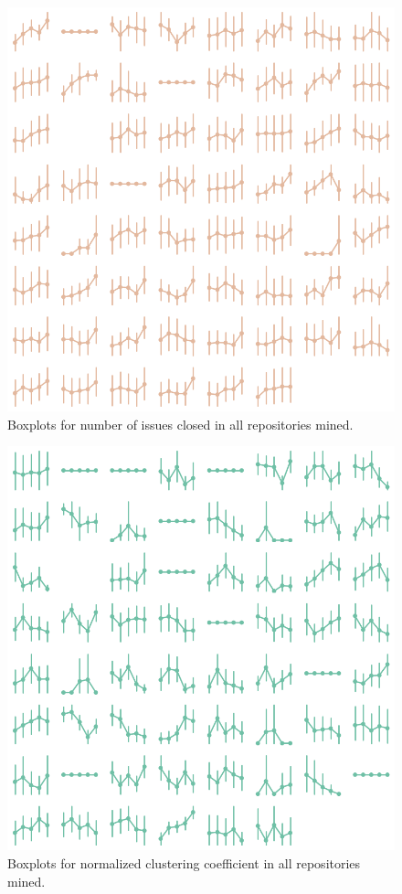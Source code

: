 \begin{appendices}
    \begin{figure}[!htb]
        \centering
        \includegraphics[width=\textwidth]{figures/quantitative/pointplots/issues_closed_all.png}
        \caption{Boxplots for number of issues closed  in all repositories mined.}
        \label{app:issues_closed-box-app}
    \end{figure}

    \begin{figure}[!htb]
        \centering
        \includegraphics[width=\textwidth]{figures/quantitative/pointplots/clustering_coeff_all.png}
        \caption{Boxplots for normalized clustering coefficient in all repositories mined.}
        \label{app:clustering-box-app}
    \end{figure}


\end{appendices}
